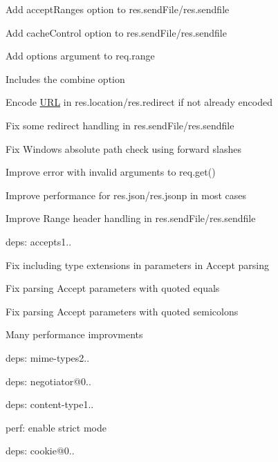 \begin{DoxyItemize}
\item Add {\ttfamily accept\+Ranges} option to {\ttfamily res.\+send\+File}/{\ttfamily res.\+sendfile}
\item Add {\ttfamily cache\+Control} option to {\ttfamily res.\+send\+File}/{\ttfamily res.\+sendfile}
\item Add {\ttfamily options} argument to {\ttfamily req.\+range}
\begin{DoxyItemize}
\item Includes the {\ttfamily combine} option
\end{DoxyItemize}
\item Encode \mbox{\hyperlink{namespace_u_r_l}{U\+RL}} in {\ttfamily res.\+location}/{\ttfamily res.\+redirect} if not already encoded
\item Fix some redirect handling in {\ttfamily res.\+send\+File}/{\ttfamily res.\+sendfile}
\item Fix Windows absolute path check using forward slashes
\item Improve error with invalid arguments to {\ttfamily req.\+get()}
\item Improve performance for {\ttfamily res.\+json}/{\ttfamily res.\+jsonp} in most cases
\item Improve {\ttfamily Range} header handling in {\ttfamily res.\+send\+File}/{\ttfamily res.\+sendfile}
\item deps\+: accepts1..
\begin{DoxyItemize}
\item Fix including type extensions in parameters in {\ttfamily Accept} parsing
\item Fix parsing {\ttfamily Accept} parameters with quoted equals
\item Fix parsing {\ttfamily Accept} parameters with quoted semicolons
\item Many performance improvments
\item deps\+: mime-\/types2..
\item deps\+: negotiator@0..
\end{DoxyItemize}
\item deps\+: content-\/type1..
\begin{DoxyItemize}
\item perf\+: enable strict mode
\end{DoxyItemize}
\item deps\+: cookie@0..
\begin{DoxyItemize}

\end{DoxyItemize}
\end{DoxyItemize}
